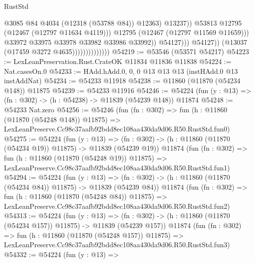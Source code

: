 \begin{lexlean}{RustStd}
\begin{coremodule}
                                                    @3085
                                                    @84
                                                    @4034
                                                    (@12318 (@53788 @84))
                                                    @12363)
                                                  @13237))
                                              @53813
                                              @12795
                                              (@12467 (@12797 @11634 @4119)))
                                            @12795
                                            (@12467 (@12797 @11569 @11659)))
                                          @33972
                                          @33975
                                          @33978
                                          @33982
                                          @33986
                                          @33992))
                                      @54127)))
                                @54127))
                            (@13037 (@17459 @3272 @4635))))))))))))))
@54219 := @53546 (@53571 @54217)
@54223 := LexLeanPreservation.Rust.CrateOK @11834 @11836 @11838
@54224 := Nat.casesOn.{0}
@54233 := HAdd.hAdd.{0, 0, 0} @13 @13 @13 (instHAdd.{0} @13 instAddNat)
@54234 := @54233 @11918
@54238 := @11860 (@11870 (@54234 @148)) @11875
@54239 := @54233 @11916
@54246 := @54224 (fun (y : @13) => (fn : @302) -> (h : @54238) -> @11839 (@54239 @148)) @11874
@54248 := @54233 Nat.zero
@54256 := @54246
    (fun (fn : @302) =>
    fun (h : @11860 (@11870 (@54248 @148)) @11875) =>
    LexLeanPreserve.Cc98c37aafb92bdd8ec108aa430da9d06.R50.RustStd.fun0)
@54275 := @54224
    (fun (y : @13) =>
    (fn : @302) -> (h : @11860 (@11870 (@54234 @19)) @11875) -> @11839 (@54239 @19))
    @11874
    (fun (fn : @302) =>
    fun (h : @11860 (@11870 (@54248 @19)) @11875) =>
    LexLeanPreserve.Cc98c37aafb92bdd8ec108aa430da9d06.R50.RustStd.fun1)
@54294 := @54224
    (fun (y : @13) =>
    (fn : @302) -> (h : @11860 (@11870 (@54234 @84)) @11875) -> @11839 (@54239 @84))
    @11874
    (fun (fn : @302) =>
    fun (h : @11860 (@11870 (@54248 @84)) @11875) =>
    LexLeanPreserve.Cc98c37aafb92bdd8ec108aa430da9d06.R50.RustStd.fun2)
@54313 := @54224
    (fun (y : @13) =>
    (fn : @302) -> (h : @11860 (@11870 (@54234 @157)) @11875) -> @11839 (@54239 @157))
    @11874
    (fun (fn : @302) =>
    fun (h : @11860 (@11870 (@54248 @157)) @11875) =>
    LexLeanPreserve.Cc98c37aafb92bdd8ec108aa430da9d06.R50.RustStd.fun3)
@54332 := @54224
    (fun (y : @13) =>

\end{coremodule}
\end{lexlean}
